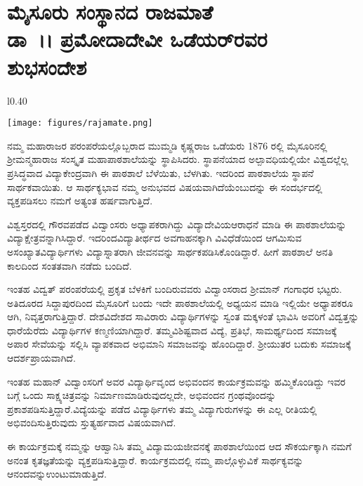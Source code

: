 {\fontsize{14}{16}\selectfont

\chapter[ರಾಜಮಾತೆ ಡಾ~।। ಪ್ರಮೋದಾದೇವಿ ಒಡೆಯರ್ ರವರ ಶುಭಸಂದೇಶ]{ಮೈಸೂರು ಸಂಸ್ಥಾನದ ರಾಜಮಾತೆ\\ ಡಾ~।। ಪ್ರಮೋದಾದೇವೀ ಒಡೆಯರ್‌ರವರ\\ ಶುಭಸಂದೇಶ}

\begin{wrapfigure}{l}{0.40\textwidth}
\centerline{\texttt{[image: figures/rajamate.png]}}
\end{wrapfigure}	
ನಮ್ಮ ಮಹಾರಾಜರ ಪರಂಪರೆಯಲ್ಲೊಬ್ಬರಾದ ಮುಮ್ಮಡಿ ಕೃಷ್ಣರಾಜ ಒಡೆಯರು 1876 ರಲ್ಲಿ ಮೈಸೂರಿನಲ್ಲಿ  ಶ್ರೀಮನ್ಮಹಾ\-ರಾಜ ಸಂಸ್ಕೃತ ಮಹಾಪಾಠಶಾಲೆಯನ್ನು ಸ್ಥಾಪಿಸಿ\-ದರು. ಸ್ಥಾಪನೆಯಾದ ಅಲ್ಪಾವಧಿಯಲ್ಲಿಯೇ ವಿಶ್ವದಲ್ಲೆಲ್ಲ  ಪ್ರಸಿದ್ಧ\-ವಾದ ವಿದ್ಯಾಕೇಂದ್ರವಾಗಿ ಈ ಪಾಠಶಾಲೆ ಬೆಳೆಯಿತು, \hbox{ಬೆಳಗಿತು}. ಇದರಿಂದ ಪಾಠಶಾಲೆಯ ಸ್ಥಾಪನೆ ಸಾರ್ಥಕ\-ವಾಯಿತು. ಆ ಸಾರ್ಥಕ್ಯಭಾವ ನಮ್ಮ ಅನುಭವದ ವಿಷಯವಾಗಿದೆಯೆಂಬುದನ್ನು ಈ ಸಂದರ್ಭದಲ್ಲಿ ವ್ಯಕ್ತಪಡಿಸಲು ನಮಗೆ ಅತ್ಯಂತ ಹರ್ಷವಾಗುತ್ತಿದೆ.
\vskip 8pt

ವಿಶ್ವಸ್ತರದಲ್ಲಿ ಗೌರವಪಡೆದ ವಿದ್ವಾಂಸರು ಅಧ್ಯಾಪಕರಾಗಿದ್ದು ವಿದ್ಯಾದೇವಿಯ\break ಆರಾಧನೆ ಮಾಡಿ ಈ ಪಾಠಶಾಲೆಯನ್ನು ವಿದ್ಯಾಕ್ಷೇತ್ರವನ್ನಾಗಿಸಿದ್ದಾರೆ. ಇದರಿಂದ\break ವಿದ್ಯಾತೀರ್ಥದ ಅವಗಾಹನಕ್ಕಾಗಿ ವಿವಿಧೆಡೆಯಿಂದ ಆಗಮಿಸುವ ಅಸಂಖ್ಯಾತ\break ವಿದ್ಯಾರ್ಥಿಗಳು ವಿದ್ಯಾಸ್ನಾತರಾಗಿ ಜೀವನವನ್ನು ಸಾರ್ಥಕಪಡಿಸಿಕೊಂಡಿದ್ದಾರೆ. ಹೀಗೆ ಪಾಠಶಾಲೆ ಅನತಿ ಕಾಲದಿಂದ ಸಂತತವಾಗಿ ನಡೆದು ಬಂದಿದೆ.
\vskip 8pt

ಇಂತಹ ವಿದ್ವತ್ ಪರಂಪರೆಯಲ್ಲಿ ಪ್ರಕೃತ ಬೆಳಕಿಗೆ ಬಂದಿರುವವರು ವಿದ್ವಾಂಸರಾದ ಶ್ರೀಮಾನ್ ಗಂಗಾಧರ ಭಟ್ಟರು.  ಅತಿದೂರದ ಸಿದ್ದಾಪುರದಿಂದ ಮೈಸೂರಿಗೆ ಬಂದು ಇದೇ ಪಾಠಶಾಲೆಯಲ್ಲಿ ಅಧ್ಯಯನ ಮಾಡಿ ಇಲ್ಲಿಯೇ ಅಧ್ಯಾಪಕರೂ ಆಗಿ, ನಿವೃತ್ತರಾಗು\-ತ್ತಿದ್ದಾರೆ. ದೇಶ\enginline{-}ವಿದೇಶದ ಸಾವಿರಾರು ವಿದ್ಯಾರ್ಥಿಗಳನ್ನು ಸ್ವಂತ ಮಕ್ಕಳಂತೆ ಭಾವಿಸಿ ಅವರಿಗೆ ವಿದ್ವತ್ತನ್ನು ಧಾರೆಯೆರೆದು ವಿದ್ಯಾರ್ಥಿಗಳ ಕಣ್ಮಣಿಯಾಗಿದ್ದಾರೆ. ತಮ್ಮ\break ವಿಶಿಷ್ಟವಾದ ವಿದ್ಯೆ, ಪ್ರತಿಭೆ, ಸಾಮರ್ಥ್ಯದಿಂದ ಸಮಾಜಕ್ಕೆ ಅಪಾರ ಸೇವೆಯನ್ನು ಸಲ್ಲಿಸಿ ವ್ಯಾಪಕವಾದ ಅಭಿಮಾನಿ ಸಮಾಜವನ್ನು ಹೊಂದಿದ್ದಾರೆ. ಶ್ರೀಯುತರ ಬದುಕು ಸಮಾಜಕ್ಕೆ ಆದರ್ಶಪ್ರಾಯವಾಗಿದೆ. 

ಇಂತಹ ಮಹಾನ್ ವಿದ್ವಾಂಸರಿಗೆ ಅವರ ವಿದ್ಯಾರ್ಥಿವೃಂದ ಅಭಿವಂದನ ಕಾರ್ಯ\-ಕ್ರಮವನ್ನು ಹಮ್ಮಿಕೊಂಡಿದ್ದು ಇವರ ಬಗ್ಗೆ ಒಂದು ಸಾಕ್ಷ್ಯಚಿತ್ರವನ್ನು ನಿರ್ಮಾಣ\break ಮಾಡಿರುವುದಲ್ಲದೇ, ಅಭಿವಂದನ ಗ್ರಂಥವೊಂದನ್ನು ಪ್ರಕಾಶಪಡಿಸುತ್ತಿದ್ದಾರೆ.\break ವಿದ್ಯೆಯನ್ನು ಪಡೆದ ವಿದ್ಯಾರ್ಥಿಗಳು ತಮ್ಮ ವಿದ್ಯಾಗುರುಗಳನ್ನು ಈ ಎಲ್ಲ ರೀತಿಯಲ್ಲಿ ಅಭಿವಂದಿಸುತ್ತಿರುವುದು  ಸ್ತುತ್ಯರ್ಹವಾದ ವಿಷಯವಾಗಿದೆ. 

ಈ ಕಾರ್ಯಕ್ರಮಕ್ಕೆ ನಮ್ಮನ್ನು ಆಹ್ವಾನಿಸಿ ತಮ್ಮ ವಿದ್ಯಾಮಯಜೀವನಕ್ಕೆ ಪಾಠಶಾಲೆ\-ಯಿಂದ ಆದ ಸೌಕರ್ಯಕ್ಕಾಗಿ ನಮಗೆ ಅನಂತ ಕೃತಜ್ಞತೆಯನ್ನು \hbox{ವ್ಯಕ್ತಪಡಿಸುತ್ತಿದ್ದಾರೆ}. ಕಾರ್ಯಕ್ರಮದಲ್ಲಿ ನಮ್ಮ ಪಾಲ್ಗೊಳ್ಳುವಿಕೆ ಸಾರ್ಥಕ್ಯವನ್ನು ಆನಂದವನ್ನು\break ಉಂಟುಮಾಡುತ್ತಿದೆ.

}
